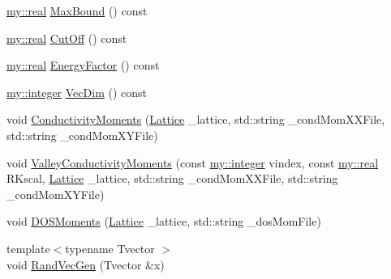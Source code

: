 \begin{DoxyCompactItemize}
\item 
\hyperlink{namespacemy_ad61baeaeda728a4c48dd64f93e44a46c}{my\+::real} \hyperlink{classKpm_a6e93b09e4f69258a1716b792bcb3e262}{Max\+Bound} () const 
\item 
\hyperlink{namespacemy_ad61baeaeda728a4c48dd64f93e44a46c}{my\+::real} \hyperlink{classKpm_a4e10c348cab2dc443a7f15ac3f2d750f}{Cut\+Off} () const 
\item 
\hyperlink{namespacemy_ad61baeaeda728a4c48dd64f93e44a46c}{my\+::real} \hyperlink{classKpm_a22b683394cad5e1d451aa77985428db2}{Energy\+Factor} () const 
\item 
\hyperlink{namespacemy_a42365393c537edae1e89d20ff90d1923}{my\+::integer} \hyperlink{classKpm_a5d4e9f884317e794a2d96e15f1fe4574}{Vec\+Dim} () const 
\item 
void \hyperlink{classKpm_a91fb7119bcb84727ea972c9e57d694a0}{Conductivity\+Moments} (\hyperlink{classLattice}{Lattice} \+\_\+lattice, std\+::string \+\_\+cond\+Mom\+X\+X\+File, std\+::string \+\_\+cond\+Mom\+X\+Y\+File)
\item 
void \hyperlink{classKpm_ab77a52749e26d0b2f55a592d7efc1022}{Valley\+Conductivity\+Moments} (const \hyperlink{namespacemy_a42365393c537edae1e89d20ff90d1923}{my\+::integer} vindex, const \hyperlink{namespacemy_ad61baeaeda728a4c48dd64f93e44a46c}{my\+::real} R\+Kscal, \hyperlink{classLattice}{Lattice} \+\_\+lattice, std\+::string \+\_\+cond\+Mom\+X\+X\+File, std\+::string \+\_\+cond\+Mom\+X\+Y\+File)
\item 
void \hyperlink{classKpm_a189d22b5f8c7cf969a2c9e433554d867}{D\+O\+S\+Moments} (\hyperlink{classLattice}{Lattice} \+\_\+lattice, std\+::string \+\_\+dos\+Mom\+File)
\item 
{\footnotesize template$<$typename Tvector $>$ }\\void \hyperlink{classKpm_ab9bf6a42158cfb6967b2b48efdd973c0}{Rand\+Vec\+Gen} (Tvector \&x)
\end{DoxyCompactItemize}
